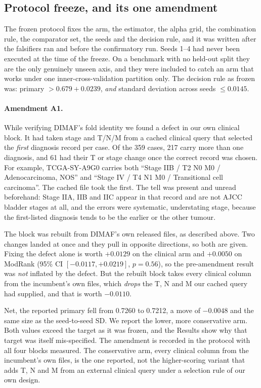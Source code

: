 \subsection*{Protocol freeze, and its one amendment}

The frozen protocol fixes the arm, the estimator, the alpha
grid, the combination rule, the comparator set, the seeds and the decision rule, and it was written
after the falsifiers ran and before the confirmatory run. Seeds 1--4 had never been executed at the
time of the freeze. On a benchmark with no held-out split they are the only genuinely unseen axis,
and they were included to catch an arm that works under one inner-cross-validation partition only.
The decision rule as frozen was: primary $> 0.679 + 0.0239$, \emph{and} standard deviation across
seeds $\leq 0.0145$.

\paragraph{Amendment A1.} While verifying DIMAF's fold identity we found a defect in our own
clinical block. It had taken stage and T/N/M from a cached clinical query that selected the
\emph{first} diagnosis record per case. Of the 359 cases, 217 carry more than one diagnosis, and 61 had
their T or stage change once the correct record was chosen. For example, TCGA-SY-A9G0 carries both
``Stage IIB / T2 N0 M0 / Adenocarcinoma, NOS'' and ``Stage IV / T4 N1 M0 / Transitional cell
carcinoma''. The cached file took the first. The tell was present and unread beforehand: Stage IIA,
IIB and IIC appear in that record and are not AJCC bladder stages at all, and the errors were
systematic, understating stage, because the first-listed diagnosis tends to be the earlier or the
other tumour.

The block was rebuilt from DIMAF's own released files, as described above. Two changes landed at once and they pull in opposite directions, so both are given. Fixing the defect alone is worth
$+0.0129$ on the clinical arm and $+0.0050$ on ModRank (95\% CI $[-0.0117,+0.0219]$,
$p=0.56$), so the pre-amendment result was \emph{not} inflated by the defect. But the rebuilt
block takes every clinical column from the incumbent's own files, which \emph{drops} the T, N and M
our cached query had supplied, and that is worth $-0.0110$.

Net, the reported primary fell from 0.7260 to 0.7212, a move of $-0.0048$ and the same size
as the seed-to-seed SD. We report the lower, more conservative arm. Both values exceed the target
as it was frozen, and the Results show why that target was itself mis-specified. The amendment is recorded in the protocol with
all four blocks measured. The conservative arm, every clinical column from the incumbent's own
files, is the one reported, not the higher-scoring variant that adds T, N and M from an external
clinical query under a selection rule of our own design.


